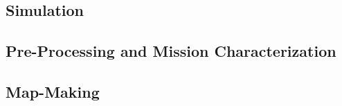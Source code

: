 \subsection{Simulation}

\subsection{Pre-Processing and Mission Characterization}

\subsection{Map-Making}


%



